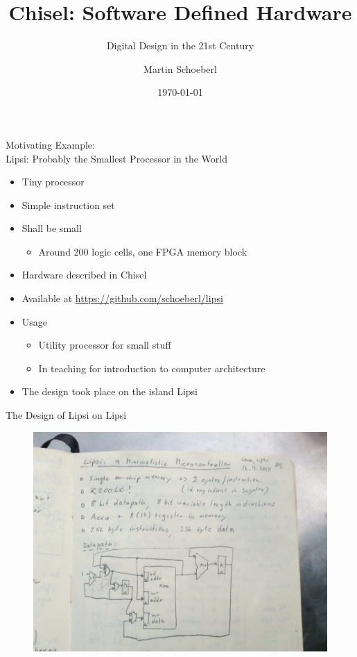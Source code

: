 

\newif\ifbook


\title{Chisel: Software Defined Hardware}
\subtitle{Digital Design in the 21st Century}
\author{Martin Schoeberl}
\date{\today}



\begin{frame}
\titlepage
\end{frame}

\begin{frame}[fragile]{Motivating Example:\\
Lipsi: Probably the Smallest Processor in the World}
\begin{itemize}
\item Tiny processor
\item Simple instruction set
\item Shall be small
\begin{itemize}
\item Around 200 logic cells, one FPGA memory block
\end{itemize}
\item Hardware described in Chisel
\item Available at \url{https://github.com/schoeberl/lipsi}
\item Usage
\begin{itemize}
\item Utility processor for small stuff
\item In teaching for introduction to computer architecture
\end{itemize}
\item The design took place on the island Lipsi
\end{itemize}
\end{frame}

\begin{frame}[fragile]{The Design of Lipsi on Lipsi}
\begin{figure}
    \centering
    \includegraphics[scale=0.3]{lipsi}
\end{figure}
\end{frame}

